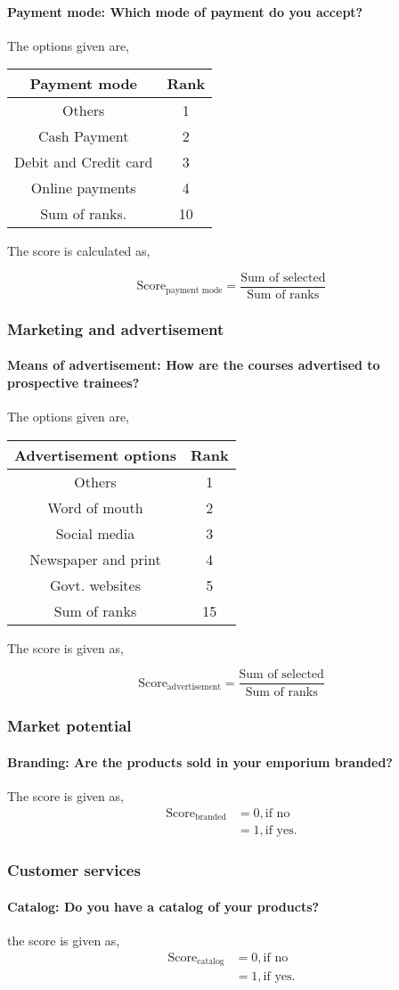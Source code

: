 \documentclass[oneside,twocolumn]{article}
\newcommand{\tsub}[2]{\text{#1}_{\text{#2}}}
\newcommand{\dsub}[2]{\dfrac{\text{#1}}{\text{#2}}}
\newcommand{\multsel}[1]
{
	\[
		\tsub{Score}{#1} = \dsub{Sum of selected}{Sum of ranks}
	\]
}
\newenvironment{ttable}
{
\begin{center}
\begin{tabular}{c|c}
\hline
}
{
\\ \hline
\end{tabular}
\end{center}
}
\begin{document}
\paragraph{Payment mode: Which mode of payment do you accept?}
The options given are,
\begin{ttable}
	Payment mode & Rank \\ \hline
	Others & 1 \\
	Cash Payment & 2 \\
	Debit and Credit card & 3 \\
	Online payments & 4 \\ \hline
	Sum of ranks. & 10
\end{ttable}
The score is calculated as,
\multsel{payment mode}
\subsubsection{Marketing and advertisement}
\paragraph{Means of advertisement: How are the courses advertised to prospective trainees?}
The options given are,
\begin{ttable}
	Advertisement options & Rank \\ \hline
	Others & 1 \\
	Word of mouth & 2 \\
	Social media & 3 \\
	Newspaper and print & 4 \\
	Govt. websites & 5 \\ \hline
	Sum of ranks & 15
\end{ttable}
The score is given as,
\multsel{advertisement}
\subsubsection{Market potential}
\paragraph{Branding: Are the products sold in your emporium branded?}
The score is given as,
\begin{align*}
	\tsub{Score}{branded} &= 0, \text{if no} \\
	&= 1, \text{if yes}.
\end{align*}

\subsubsection{Customer services}
\paragraph{Catalog: Do you have a catalog of your products?}
the score is given as,
\begin{align*}
	\tsub{Score}{catalog} &= 0, \text{if no} \\
	&= 1, \text{if yes}.
\end{align*}
\end{document}
